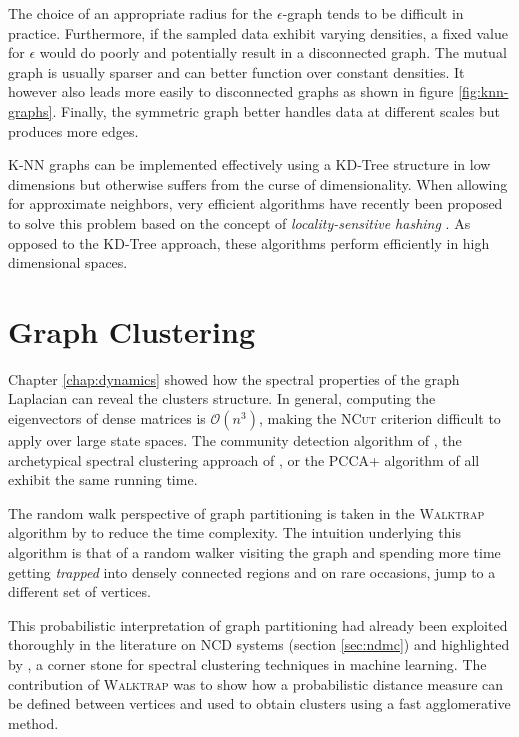 The choice of an appropriate radius for the $\epsilon$-graph tends to be difficult in practice. Furthermore, if the sampled data exhibit varying densities, a fixed value for $\epsilon$ would do poorly and potentially result in a disconnected graph. The mutual graph is usually sparser and can better function over constant densities. It however also leads more easily to  disconnected graphs as shown in figure \ref{fig:knn-graphs}. Finally, the symmetric graph better handles data at different scales but produces more edges.  

K-NN graphs can be implemented effectively using a KD-Tree \parencite{Friedman1977}
structure in low dimensions but otherwise suffers from the curse of dimensionality.
When allowing for approximate neighbors, very efficient algorithms have recently
been proposed to solve this problem based on the concept of \textit{locality-sensitive
hashing} \parencite{Andoni2008}. As opposed to the KD-Tree approach, these algorithms perform
efficiently in high dimensional spaces. 

\section{Graph Clustering}
Chapter \ref{chap:dynamics} showed how the spectral properties of the graph Laplacian can reveal the clusters structure. In general, computing the eigenvectors of dense matrices is $\mathcal{O}(n^3)$, making the \textsc{NCut} criterion difficult to apply over large state spaces. The community detection algorithm of \cite{Newman2006}, the archetypical spectral clustering approach of \cite{Ng2001}, or the \textsc{PCCA+} algorithm of \cite{Deuflhard2005} all exhibit the same running time.

The random walk perspective of graph partitioning is taken in the \textsc{Walktrap} algorithm by \cite{Pons2005} to reduce the time complexity. The intuition underlying this algorithm is that of a random walker visiting the graph and spending more time getting \textit{trapped} into densely connected regions and on rare occasions, jump to a different set of vertices.

This probabilistic interpretation of graph partitioning had already been exploited thoroughly in the literature on NCD systems (section \ref{sec:ndmc}) and highlighted by \cite{Shi2001}, a corner stone for spectral clustering techniques in machine learning. The contribution of \textsc{Walktrap} was to show how a probabilistic distance measure can be defined between vertices and used to obtain clusters using a fast agglomerative method.

